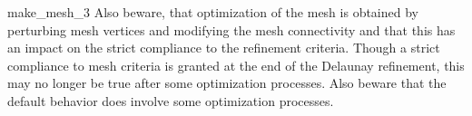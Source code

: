 \begin{ccRefFunction}{make_mesh_3}
Also beware, that optimization of the mesh is obtained
 by perturbing mesh vertices and modifying the mesh connectivity
 and that this  has an impact
on the strict compliance to the refinement criteria. 
Though a strict compliance to mesh criteria
is granted at the end of the Delaunay refinement, this may  no longer be true after
some optimization processes. Also beware that the default behavior does involve some
optimization processes.


\ccSeeAlso

 \\
\\
 \\
 \\
 \\
 \\
 \\
 \\
 \\
 \\
 \\
 \\
 \\
 \\
 \\



\end{ccRefFunction}

\ccRefPageEnd

